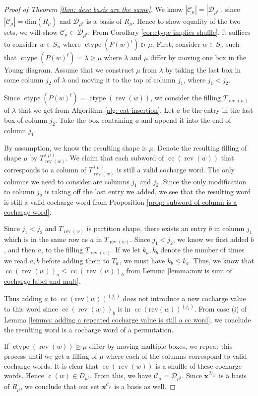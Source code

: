 \documentclass[ALCO, Unicode]{cedram}
\DeclareMathOperator{\ctype}{ctype}
\DeclareMathOperator{\rev}{rev}
\DeclareMathOperator{\cc}{cc}
\DeclareMathOperator{\cw}{c}
\begin{document}
\begin{proof}[Proof of  Theorem \ref{thm: desc basis are the same}]
We know $|\mathcal{C}_\mu| = |\mathcal{D}_{\mu^t}|$, since $|\mathcal{C}_\mu| = \text{dim}(R_{\mu})$ and $\mathcal{D}_{\mu^t}$ is a basis of $R_{\mu}$.
Hence to show equality of the two sets, we will show $\mathcal{C}_\mu \subset \mathcal{D}_{\mu^t}$.
From Corollary \ref{cor:ctype implies shuffle}, it suffices to consider $w\in S_n$ where $\ctype(P(w)^t) \rhd \mu$.
First, consider $w\in S_n$ such that $\ctype(P(w)^t)  = \lambda\unrhd \mu$ where $\lambda$ and $\mu$ differ by moving one box in the Young diagram. 
Assume that we construct $\mu$ from $\lambda$ by taking the last box in some column $j_2$ of $\lambda$ and moving it to the top of column $j_1$, where $j_1< j_2$. 


Since $\ctype(P(w)^t) = \ctype(\rev(w))$, we consider the filling $T_{\rev(w)}$ of $\lambda$ that we get from Algorithm \ref{alg: cat insertion}.
Let $a$ be the entry in the last box of column $j_2$. 
Take the box containing $a$ and append it into the end of column $j_1$.

By assumption, we know the resulting shape is $\mu$. Denote the resulting filling of shape $\mu$ by $T_{\rev(w)}^{(\mu)}$. 
We claim that each subword of $\cc(\rev(w))$ that corresponds to a column of $T_{\rev(w)}^{(\mu)}$ is still a valid cocharge word.
The only columns we need to consider are columns $j_1$ and $j_2$. Since the only modification to column $j_2$ is taking off the last entry we added, we see that the resulting word is still a valid cocharge word from Proposition \ref{prop: subword of column is a cocharge word}.

Since $j_1< j_2$ and $T_{\rev(w)}$ is partition shape, there exists an entry $b$ in column $j_1$ which is in the same row as $a$ in $T_{\rev(w)}$. Since $j_1<j_2$, we know we first added $b$, and then $a$, to the filling $T_{\rev(w)}$.  If we let $k_a, k_b$ denote the number of times we read $a,b$ before adding them to $T_w$, we must have $k_b \leq  k_a$. Thus, we know that $\cc(\rev(w))_a \leq  \cc(\rev(w))_b$ from Lemma \ref{lemma:row is sum of cocharge label and mult}. 

Thus adding $a$ to $\cc(\text{rev}(w))^{(j_1)}$ does not introduce a new cocharge value to this word since $\cc(\rev(w))_b$ is in $\cc(\text{rev}(w))^{(j_1)}$.
From case (i) of Lemma \ref{lemma: adding a repeated cocharge value is still a cc word}, we conclude the resulting word is a cocharge word of a permutation. 

If $\ctype(\rev(w))\unrhd \mu$ differ by moving multiple boxes, we repeat this process until we get a filling of $\mu$ where each of the columns correspond to valid cocharge words. It is clear that $\cc(\rev(w))$ is a shuffle of these cocharge words.
Hence $\cw(w) \in D_{\mu^t}$.
From this, we have $\mathcal{C}_\mu = \mathcal{D}_{\mu^t}$. Since $\mathbf{x}^{\mathcal{D}_{\mu^t}}$ is a basis of $R_{\mu}$, we conclude that our set  $\mathbf{x}^{\mathcal{C}_\mu}$  is a basis as well.
\end{proof}
\end{document}
